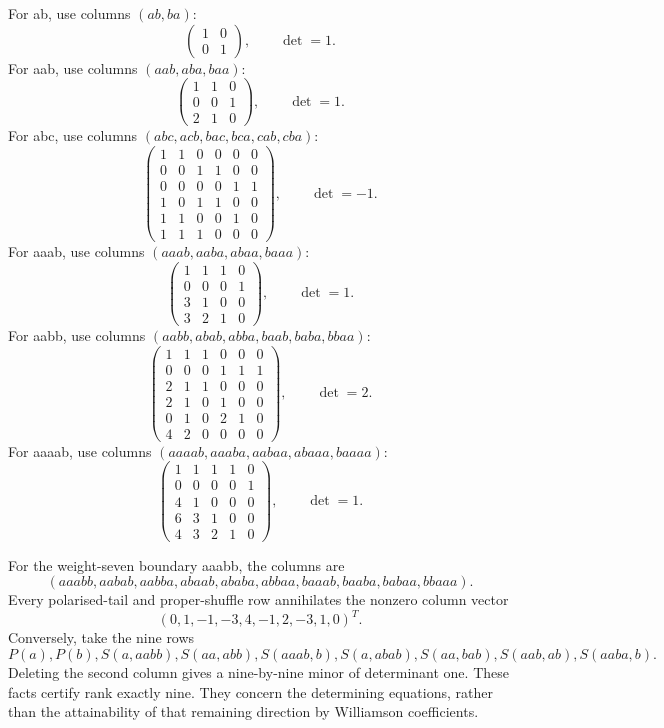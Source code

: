 \documentclass[
  11pt,
  a4paper,
]{scrartcl}
\begin{document}
For ab, use columns \((ab,ba)\): \[
\begin{pmatrix}1&0\\0&1\end{pmatrix},\qquad \det=1.
\] For aab, use columns \((aab,aba,baa)\): \[
\begin{pmatrix}
1&1&0\\0&0&1\\2&1&0
\end{pmatrix},\qquad \det=1.
\] For abc, use columns \((abc,acb,bac,bca,cab,cba)\): \[
\begin{pmatrix}
1&1&0&0&0&0\\
0&0&1&1&0&0\\
0&0&0&0&1&1\\
1&0&1&1&0&0\\
1&1&0&0&1&0\\
1&1&1&0&0&0
\end{pmatrix},\qquad \det=-1.
\] For aaab, use columns \((aaab,aaba,abaa,baaa)\): \[
\begin{pmatrix}
1&1&1&0\\0&0&0&1\\3&1&0&0\\3&2&1&0
\end{pmatrix},\qquad \det=1.
\] For aabb, use columns \((aabb,abab,abba,baab,baba,bbaa)\): \[
\begin{pmatrix}
1&1&1&0&0&0\\
0&0&0&1&1&1\\
2&1&1&0&0&0\\
2&1&0&1&0&0\\
0&1&0&2&1&0\\
4&2&0&0&0&0
\end{pmatrix},\qquad \det=2.
\] For aaaab, use columns \((aaaab,aaaba,aabaa,abaaa,baaaa)\): \[
\begin{pmatrix}
1&1&1&1&0\\0&0&0&0&1\\4&1&0&0&0\\6&3&1&0&0\\4&3&2&1&0
\end{pmatrix},\qquad \det=1.
\]

For the weight-seven boundary aaabb, the columns are \[
(aaabb,aabab,aabba,abaab,ababa,abbaa,baaab,baaba,babaa,bbaaa).
\] Every polarised-tail and proper-shuffle row annihilates the nonzero
column vector \[
(0,1,-1,-3,4,-1,2,-3,1,0)^T.
\] Conversely, take the nine rows \[
P(a),P(b),S(a,aabb),S(aa,abb),S(aaab,b),
S(a,abab),S(aa,bab),S(aab,ab),S(aaba,b).
\] Deleting the second column gives a nine-by-nine minor of determinant
one. These facts certify rank exactly nine. They concern the determining
equations, rather than the attainability of that remaining direction by
Williamson coefficients.
\end{document}
